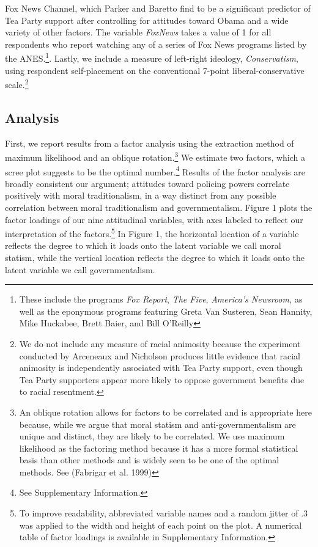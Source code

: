 \documentclass[12pt,]{article}
\let\rmarkdownfootnote\footnote%
\def\footnote{\protect\rmarkdownfootnote}
\begin{document}
Fox News Channel, which Parker and Baretto find to be a significant
predictor of Tea Party support after controlling for attitudes toward
Obama and a wide variety of other factors. The variable \emph{FoxNews}
takes a value of 1 for all respondents who report watching any of a
series of Fox News programs listed by the ANES.\footnote{These include
  the programs \emph{Fox Report}, \emph{The Five}, \emph{America's
  Newsroom,} as well as the eponymous programs featuring Greta Van
  Susteren, Sean Hannity, Mike Huckabee, Brett Baier, and Bill O'Reilly}.
Lastly, we include a measure of left-right ideology,
\emph{Conservatism}, using respondent self-placement on the conventional
7-point liberal-conservative scale.\footnote{We do not include any
  measure of racial animosity because the experiment conducted by
  Arceneaux and Nicholson produces little evidence that racial animosity
  is independently associated with Tea Party support, even though Tea
  Party supporters appear more likely to oppose government benefits due
  to racial resentment.}

\subsection{Analysis}\label{analysis}

First, we report results from a factor analysis using the extraction
method of maximum likelihood and an oblique rotation.\footnote{An
  oblique rotation allows for factors to be correlated and is
  appropriate here because, while we argue that moral statism and
  anti-governmentalism are unique and distinct, they are likely to be
  correlated. We use maximum likelihood as the factoring method because
  it has a more formal statistical basis than other methods and is
  widely seen to be one of the optimal methods. See (Fabrigar et al.
  1999)} We estimate two factors, which a scree plot suggests to be the
optimal number.\footnote{See Supplementary Information.} Results of the
factor analysis are broadly consistent our argument; attitudes toward
policing powers correlate positively with moral traditionalism, in a way
distinct from any possible correlation between moral traditionalism and
governmentalism. Figure 1 plots the factor loadings of our nine
attitudinal variables, with axes labeled to reflect our interpretation
of the
factors.\footnote{To improve readability, abbreviated variable names and a random jitter of .3 was applied to the width and height of each point on the plot. A numerical table of factor loadings is available in Supplementary Information.}
In Figure 1, the horizontal location of a variable reflects the degree
to which it loads onto the latent variable we call moral statism, while
the vertical location reflects the degree to which it loads onto the
latent variable we call governmentalism.
\end{document}
